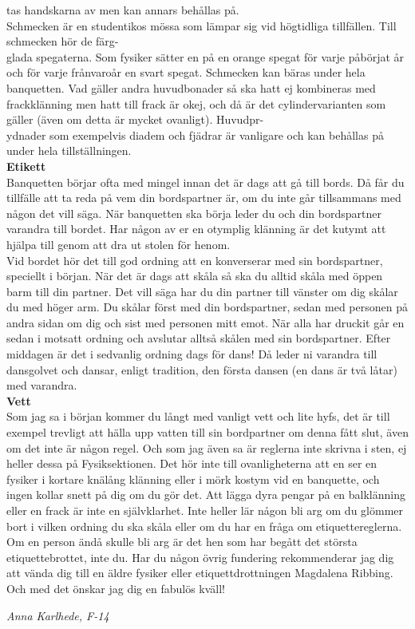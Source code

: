 \documentclass[a6paper,12pt]{article}
\begin{document}
tas handskarna av men kan annars behållas på.\\
Schmecken är en studentikos mössa som lämpar sig vid högtidliga 
tillfällen. Till schmecken hör de färg-\\
glada spegaterna. Som fysiker sätter en på en orange spegat för 
varje påbörjat år och för varje frånvaroår en svart spegat. Schmecken kan 
bäras under hela banquetten. Vad gäller andra huvudbonader så ska hatt 
ej kombineras med frackklänning men hatt till frack är okej, och då 
är det cylindervarianten som gäller (även om detta är mycket ovanligt). 
Huvudpr-\\
ydnader som exempelvis diadem och fjädrar är vanligare och kan 
behållas på under hela tillställningen.\\
\normalsize\textbf{Etikett}\\
\footnotesize Banquetten börjar ofta med mingel innan det är dags att gå 
till bords. Då får du tillfälle att ta reda på vem din bordspartner är, 
om du inte går tillsammans med någon det vill säga. När banquetten 
ska börja leder du och din bordspartner varandra till bordet. Har någon 
av er en otymplig klänning är det kutymt att hjälpa till genom att dra 
ut stolen för henom.\\
Vid bordet hör det till god ordning att en konverserar med sin bordspartner, 
speciellt i början. När det är dags att skåla så ska du alltid skåla med 
öppen barm
\newpage
\setlength{\oddsidemargin}{-0.57in}
\noindent
till din partner. Det vill säga har du din partner till vänster om dig 
skålar du med höger arm. Du skålar först med din bordspartner, sedan med 
personen på andra sidan om dig och sist med personen mitt emot. När alla 
har druckit går en sedan i motsatt ordning och avslutar alltså skålen 
med sin bordspartner. Efter middagen är det i sedvanlig ordning dags 
för dans! Då leder ni varandra till dansgolvet och dansar, enligt tradition, 
den första dansen (en dans är två låtar) med varandra.\\
\normalsize\textbf{Vett}\\
\footnotesize Som jag sa i början kommer du långt med vanligt vett och 
lite hyfs, det är till exempel trevligt att hälla upp vatten till sin 
bordpartner om denna fått slut, även om det inte är någon regel. Och som 
jag även sa är reglerna inte skrivna i sten, ej heller dessa på 
Fysiksektionen. Det hör inte till ovanligheterna att en ser en fysiker i 
kortare knälång klänning eller i mörk kostym vid en banquette, och ingen 
kollar snett på dig om du gör det. Att lägga dyra pengar på en balklänning 
eller en frack är inte en självklarhet. Inte heller lär någon bli arg om du 
glömmer bort i vilken ordning du ska skåla eller om du har en fråga om 
etiquettereglerna. Om en person ändå skulle bli arg är det hen som har begått 
det största etiquettebrottet, inte du. Har du någon övrig fundering 
rekommenderar jag dig att vända dig till en äldre fysiker eller 
etiquettdrottningen Magdalena Ribbing.\\
\indent Och med det önskar jag dig en fabulös kväll!
\begin{flushright}
\textit{Anna Karlhede, F-14}
\end{flushright}
\end{document}
